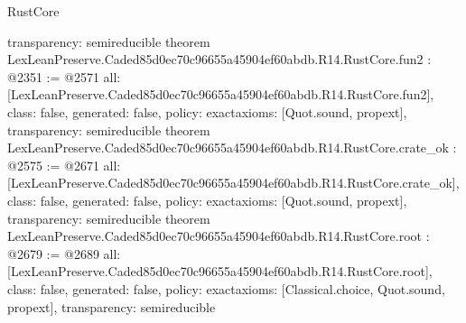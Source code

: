 \begin{lexlean}{RustCore}
\begin{coremodule}
{  transparency: semireducible
}
theorem LexLeanPreserve.Caded85d0ec70c96655a45904ef60abdb.R14.RustCore.fun2 : @2351 := @2571 {
  all: [LexLeanPreserve.Caded85d0ec70c96655a45904ef60abdb.R14.RustCore.fun2],
  class: false,
  generated: false,
  policy: exact{axioms: [Quot.sound, propext]},
  transparency: semireducible
}
theorem LexLeanPreserve.Caded85d0ec70c96655a45904ef60abdb.R14.RustCore.crate_ok : @2575 := @2671 {
  all: [LexLeanPreserve.Caded85d0ec70c96655a45904ef60abdb.R14.RustCore.crate_ok],
  class: false,
  generated: false,
  policy: exact{axioms: [Quot.sound, propext]},
  transparency: semireducible
}
theorem LexLeanPreserve.Caded85d0ec70c96655a45904ef60abdb.R14.RustCore.root : @2679 := @2689 {
  all: [LexLeanPreserve.Caded85d0ec70c96655a45904ef60abdb.R14.RustCore.root],
  class: false,
  generated: false,
  policy: exact{axioms: [Classical.choice, Quot.sound, propext]},
  transparency: semireducible
}


\end{coremodule}
\end{lexlean}
